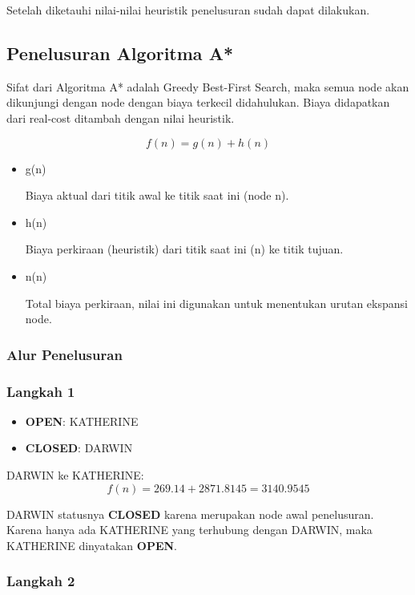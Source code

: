 \documentclass[12pt,a4paper]{article}
\begin{document}
Setelah diketauhi nilai-nilai heuristik penelusuran sudah dapat dilakukan.

\newpage

\subsection{Penelusuran Algoritma A*}

Sifat dari Algoritma A* adalah Greedy Best-First Search, maka semua node
akan dikunjungi dengan node dengan biaya terkecil didahulukan. Biaya didapatkan
dari real-cost ditambah dengan nilai heuristik.

\[
  f(n) = g(n) + h(n)
\]

\begin{itemize}
  \item g(n)

    Biaya aktual dari titik awal ke titik saat ini (node n).

  \item h(n)

    Biaya perkiraan (heuristik) dari titik saat ini (n) ke titik tujuan.

  \item n(n)

    Total biaya perkiraan, nilai ini digunakan untuk menentukan urutan ekspansi node.
\end{itemize}

\subsubsection*{Alur Penelusuran}

\subsubsection*{Langkah 1}

\begin{itemize}
    \item \textbf{OPEN}: KATHERINE
    \item \textbf{CLOSED}: DARWIN
\end{itemize}

DARWIN ke KATHERINE:  
\[
f(n) = 269.14 + 2871.8145 = 3140.9545
\]

DARWIN statusnya \textbf{CLOSED} karena merupakan node awal penelusuran.  
Karena hanya ada KATHERINE yang terhubung dengan DARWIN, maka KATHERINE dinyatakan \textbf{OPEN}.  

\subsubsection*{Langkah 2}
\end{document}
